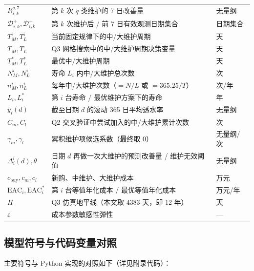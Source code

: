 \documentclass[12pt, a4paper, fontset=fandol]{ctexart}
\theoremstyle{definition}
\begin{document}
\begin{longtable}{p{}p{}p{}}
$R_{i,k}^{q,7}$ & 第 $k$ 次 $q$ 类维护的 7 日改善量 & 无量纲 \\
$\mathcal{D}_{i,k}^{+},\mathcal{D}_{i,k}^{-}$ & 第 $k$ 次维护后 / 前 7 日有效观测日期集合 & 日期集合 \\
$T_M^i, T_L^i$ & 当前固定规律下的中/大维护周期 & 天 \\
$T_M,T_L$ & Q3 网格搜索中的中/大维护周期决策变量 & 天 \\
$T_M^*,T_L^*$ & 最优中/大维护周期 & 天 \\
$N_M^i, N_L^i$ & 寿命 $L_i$ 内中/大维护总次数 & 次 \\
$n_M^i, n_L^i$ & 每年中/大维护次数（$=N/L$ 或 $=365.25/T$） & 次/年 \\
$L_i,L_i^*$ & 第 $i$ 台寿命 / 最优维护方案下的寿命 & 年 \\
$\bar{y}_i(d)$ & 截至日期 $d$ 的滚动 365 日平均透水率 & 无量纲 \\
$C_m,C_l$ & Q2 交叉验证中尝试加入的中/大维护累计次数 & 次 \\
$\gamma_m,\gamma_l$ & 累积维护项候选系数（最终取 0） & 无量纲/次 \\
$\Delta_i^l(d),\theta$ & 日期 $d$ 再做一次大维护的预测改善量 / 维护无效阈值 & 无量纲 \\
$c_{\text{buy}}, c_m, c_l$ & 新购、中维护、大维护成本 & 万元 \\
$\mathrm{EAC}_i,\mathrm{EAC}_i^*$ & 第 $i$ 台等值年化成本 / 最优等值年化成本 & 万元/年 \\
$H$ & Q3 仿真地平线（本文取 $4383$ 天，即 12 年） & 天 \\
$\varepsilon$ & 成本参数敏感性弹性 & --- \\
\end{longtable}
\endgroup

\subsection{模型符号与代码变量对照}

主要符号与 Python 实现的对照如下（详见附录代码）：
\end{document}
